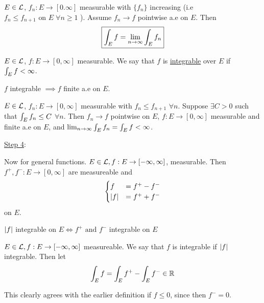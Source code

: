 \begin{theorem}
    $E \in \mathcal{L}$, $f_n: E \rightarrow [0. \infty]$ measurable with $\{ f_n \}$ increasing (i.e $f_n \leq f_{n+1} \text{ on } E \; \forall n \geq 1$ ).
    Assume $f_n \rightarrow f$ pointwise a.e on $E$.
    Then
    \[
        \boxed{ \int_{E} f = \lim_{n \rightarrow \infty} \int_{E} f_n}
    \]
\end{theorem}

\begin{definition}
    $E \in \mathcal{L}$, $f: E \rightarrow [0, \infty]$ measurable.
    We say that $f$ is \underline{integrable} over $E$ if $\int_{E} f < \infty$.
\end{definition}

\begin{prop}
    $f$ integrable $\implies f $ finite a.e on $E$.
\end{prop}

\begin{prop}
    $E \in \mathcal{L}$, $f_n: E \rightarrow [0,\infty]$ measurable with $f_n \leq f_{n+1}$ $\forall n$.
    Suppose $\exists C > 0$ such that $\int_{E} f_n \leq C $ $\forall n$.
    Then $f_n \rightarrow f$ pointwise on $E$, $f: E \rightarrow [0, \infty]$ measurable and finite a.e on $E$, and $\lim_{n \rightarrow \infty} \int_{E} f_n = \int_{E} f < \infty$.
\end{prop}

\underline{Step 4}:

Now for general functions.
$E \in \mathcal{L}, f: E \rightarrow [-\infty, \infty]$, measurable.
Then $f^{+}, f^{-}: E \rightarrow [0,\infty]$ are measureable and
\[
    \begin{cases}
        f &= f^{+} - f^{-} \\
        \lvert f\rvert &= f^{+} + f^{-}
    \end{cases}
\]
on $E$.

\begin{lemma}
    $\lvert f\rvert$ integrable on $E \iff f^{+} \text{ and } f^{-}$ integrable on $E$
\end{lemma}

\begin{definition}
    $E \in \mathcal{L}, f: E \rightarrow [-\infty, \infty]$ measureable.
    We say that $f$ is integrable if $\lvert f\rvert$ integrable.
    Then let
    \[
        \int_{E} f = \int_{E} f^{+} - \int_{E} f^{-} \in \mathbb{R}
    \]
\end{definition}
This clearly agrees with the earlier definition if $f \leq 0$, since then $f^{-} = 0$.


